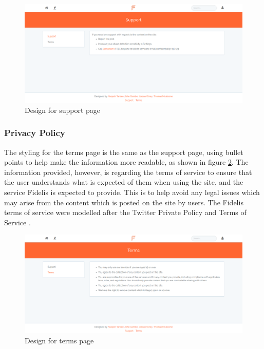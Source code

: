 \begin{figure}[H]
\centering
\includegraphics[width=\linewidth]{Images/Design/support-page}
\caption{Design for support page}
\label{fig:SupportPage}
\end{figure}

\subsubsection{Privacy Policy}
The styling for the terms page is the same as the support page, using bullet points to help make the information more readable, as shown in figure \ref{fig:ToS}. The information provided, however, is regarding the terms of service to ensure that the user understands what is expected of them when using the site, and the service Fidelis is expected to provide. This is to help avoid any legal issues which may arise from the content which is posted on the site by users. The Fidelis terms of service were modelled after the Twitter Private Policy \cite{Twitter:PrivatePolicy} and Terms of Service \cite{Twitter:ToS}.

\begin{figure}[H]
\centering
\includegraphics[width=\linewidth]{Images/Design/terms-page}
\caption{Design for terms page}
\label{fig:ToS}
\end{figure}

